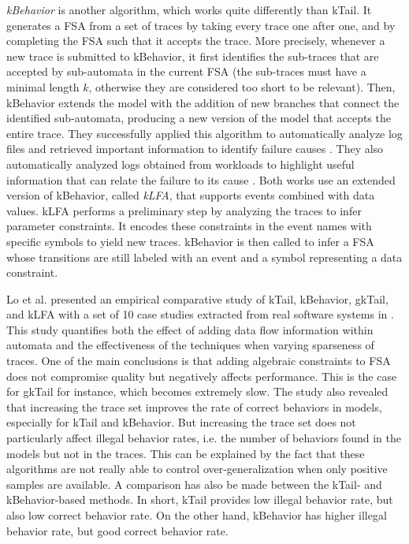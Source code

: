 \textit{kBehavior} \cite{mariani2007dynamic} is another
algorithm, which works quite differently than kTail. It generates
a FSA from a set of traces by taking every trace one after one,
and by completing the FSA such that it accepts the trace. More
precisely, whenever a new trace is submitted to kBehavior, it
first identifies the sub-traces that are accepted by sub-automata
in the current FSA (the sub-traces must have a minimal length
$k$, otherwise they are considered too short to be relevant).
Then, kBehavior extends the model with the addition of new
branches that connect the identified sub-automata,
producing a new version of the model that accepts the entire
trace. They successfully applied this algorithm to automatically
analyze log files and retrieved important information to identify
failure causes \cite{4700316}. They also automatically analyzed
logs obtained from workloads to highlight useful information that
can relate the failure to its cause
\cite{cotroneo2007investigation}. Both works
\cite{4700316,cotroneo2007investigation} use an extended version
of kBehavior, called \textit{kLFA}, that supports events
combined with data values. kLFA performs a preliminary step by
analyzing the traces to infer parameter constraints. It encodes
these constraints in the event names with specific symbols to
yield new traces. kBehavior is then called to infer a FSA whose
transitions are still labeled with an event and a symbol
representing a data constraint.

Lo et al. presented an empirical comparative study of kTail,
kBehavior, gkTail, and kLFA with a set of 10 case studies
extracted from real software systems in \cite{Lo20122063}. This
study quantifies both the effect of adding data flow information
within automata and the effectiveness of the techniques when
varying sparseness of traces. One of the main conclusions is that
adding algebraic constraints to FSA does not compromise quality
but negatively affects performance. This is the case for gkTail
for instance, which becomes extremely slow. The study also
revealed that increasing the trace set improves the rate of
correct behaviors in models, especially for kTail and kBehavior.
But increasing the trace set does not particularly affect illegal
behavior rates, i.e. the number of behaviors found in the models
but not in the traces. This can be explained by the fact that
these algorithms are not really able to control
over-generalization when only positive samples are available. A
comparison has also be made between the kTail- and
kBehavior-based methods. In short, kTail provides low illegal
behavior rate, but also low correct behavior rate. On the other
hand, kBehavior has higher illegal behavior rate, but good
correct behavior rate.

